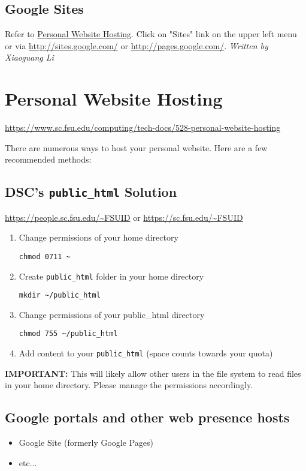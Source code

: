 \documentclass[12pt,a4paper]{article}
\begin{document}
\subsection*{Google Sites}
Refer to \href{https://www.sc.fsu.edu/computing/tech-docs/528-personal-website-hosting}{Personal Website Hosting}.
Click on "Sites" link on the upper left menu or via \url{http://sites.google.com/} or \url{http://pages.google.com/}.
\hfill \textit{Written by Xiaoguang Li}

\section{Personal Website Hosting}
\url{https://www.sc.fsu.edu/computing/tech-docs/528-personal-website-hosting}

There are numerous ways to host your personal website. Here are a few recommended methods:

\subsection*{DSC's \texttt{public\_html} Solution}
\url{https://people.sc.fsu.edu/~FSUID} or \url{https://sc.fsu.edu/~FSUID}
\begin{enumerate}
    \item Change permissions of your home directory
    \begin{verbatim}chmod 0711 ~\end{verbatim}
    \item Create \texttt{public\_html} folder in your home directory
    \begin{verbatim}mkdir ~/public_html\end{verbatim}
    \item Change permissions of your public\_html directory
    \begin{verbatim}chmod 755 ~/public_html\end{verbatim}
    \item Add content to your \texttt{public\_html} (space counts towards your quota)
\end{enumerate}
\textbf{IMPORTANT:} This will likely allow other users in the file system to read files in your home directory. Please manage the permissions accordingly.

\subsection*{Google portals and other web presence hosts}
\begin{itemize}
    \item Google Site (formerly Google Pages)
    \item etc...
\end{itemize}
\end{document}
